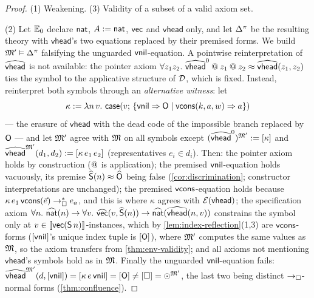 \begin{proof}
(1) Weakening.  (3) Validity of a subset of a valid axiom set.

(2) Let $\mathbb{E}_0$ declare $\mathsf{nat}$, $A \mathrel{:=} \mathsf{nat}$, $\mathsf{vec}$ and
$\mathsf{vhead}$ only, and let $\Delta^\pi$ be the resulting theory with
$\mathsf{vhead}$'s two equations replaced by their premised forms.  We
build $\mathfrak{M}' \vDash \Delta^\pi$ falsifying the unguarded
$\mathsf{vnil}$-equation.  A pointwise reinterpretation of
$\widehat{\mathsf{vhead}}$ is not available: the pointer axiom $\forall
z_1 z_2.\ \widehat{\mathsf{vhead}}^0 \mathbin{@} z_1 \mathbin{@} z_2 \approx
\widehat{\mathsf{vhead}}(z_1, z_2)$ ties the symbol to the applicative
structure of $\mathcal{D}$, which is fixed.  Instead, reinterpret both symbols
through an \emph{alternative witness}: let
\[
  \kappa \mathrel{:=} \lambda n\,v.\ \mathsf{case}(v;\,
    \{\mathsf{vnil} \Rightarrow \mathsf{O} \mid \mathsf{vcons}(k,a,w) \Rightarrow a\})
\]
--- the erasure of $\mathsf{vhead}$ with the dead code of the
impossible branch replaced by $\mathsf{O}$ --- and let $\mathfrak{M}'$ agree with
$\mathfrak{M}$ on all symbols except $(\widehat{\mathsf{vhead}}^0)^{\mathfrak{M}'} \mathrel{:=}
[\kappa]$ and $\widehat{\mathsf{vhead}}^{\mathfrak{M}'}(d_1, d_2) \mathrel{:=}
[\kappa\,e_1\,e_2]$ (representatives $e_i \in d_i$).  Then:
the pointer axiom holds by construction ($\mathbin{@}$ is application);
the premised $\mathsf{vnil}$-equation holds vacuously, its premise
$\widehat{\mathsf{S}}(n) \approx \widehat{\mathsf{O}}$ being false
(\cref{cor:discrimination}; constructor interpretations are unchanged);
the premised $\mathsf{vcons}$-equation holds because
$\kappa\,e_1\,\mathsf{vcons}(\vec{e}) \rightarrow_{\square}^{*} e_a$, and this is where $\kappa$
agrees with $\mathcal{E}(\mathsf{vhead})$; the specification axiom
$\forall n.\ \Ihat{\nat}(n) \to \forall v.\ \Ihat{\vect}(v,
\Ihat{\csS}(n)) \to \Ihat{\nat}(\Ihat{\mathsf{vhead}}(n,v))$ constrains
the symbol only at $v \in [\![ \mathsf{vec}(\mathsf{S}\,n) ]\!]_{}$-instances, which by
\cref{lem:index-reflection}(1,3) are $\mathsf{vcons}$-forms ($[\mathsf{vnil}]$'s
unique index tuple is $[\mathsf{O}]$), where $\mathfrak{M}'$ computes the same
values as $\mathfrak{M}$, so the axiom transfers from
\cref{thm:env-validity}; and all axioms not mentioning
$\mathsf{vhead}$'s symbols hold as in $\mathfrak{M}$.  Finally the unguarded
$\mathsf{vnil}$-equation fails: $\widehat{\mathsf{vhead}}^{\mathfrak{M}'}(d,
[\mathsf{vnil}]) = [\kappa\,e\,\mathsf{vnil}] = [\mathsf{O}] \neq [\square] =
\odot^{\mathfrak{M}'}$, the last two being distinct $\rightarrow_{\square}$-normal forms
(\cref{thm:confluence}).
\end{proof}


